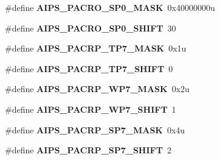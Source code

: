 \begin{DoxyCompactItemize}
\item 
\hypertarget{group___a_i_p_s___register___masks_gae111c6dd6b157819d492adaad93d3808}{}\#define {\bfseries A\+I\+P\+S\+\_\+\+P\+A\+C\+R\+O\+\_\+\+S\+P0\+\_\+\+M\+A\+S\+K}~0x40000000u\label{group___a_i_p_s___register___masks_gae111c6dd6b157819d492adaad93d3808}

\item 
\hypertarget{group___a_i_p_s___register___masks_ga79d6c2d1da36742105657a59faba869d}{}\#define {\bfseries A\+I\+P\+S\+\_\+\+P\+A\+C\+R\+O\+\_\+\+S\+P0\+\_\+\+S\+H\+I\+F\+T}~30\label{group___a_i_p_s___register___masks_ga79d6c2d1da36742105657a59faba869d}

\item 
\hypertarget{group___a_i_p_s___register___masks_ga4de7c83f4b93cd32b27b9b6a6ce21b9e}{}\#define {\bfseries A\+I\+P\+S\+\_\+\+P\+A\+C\+R\+P\+\_\+\+T\+P7\+\_\+\+M\+A\+S\+K}~0x1u\label{group___a_i_p_s___register___masks_ga4de7c83f4b93cd32b27b9b6a6ce21b9e}

\item 
\hypertarget{group___a_i_p_s___register___masks_ga1c553dab75f6ee70910eb46864ce7ac8}{}\#define {\bfseries A\+I\+P\+S\+\_\+\+P\+A\+C\+R\+P\+\_\+\+T\+P7\+\_\+\+S\+H\+I\+F\+T}~0\label{group___a_i_p_s___register___masks_ga1c553dab75f6ee70910eb46864ce7ac8}

\item 
\hypertarget{group___a_i_p_s___register___masks_ga59ca0ed1637115a15dfa3974b9872dd6}{}\#define {\bfseries A\+I\+P\+S\+\_\+\+P\+A\+C\+R\+P\+\_\+\+W\+P7\+\_\+\+M\+A\+S\+K}~0x2u\label{group___a_i_p_s___register___masks_ga59ca0ed1637115a15dfa3974b9872dd6}

\item 
\hypertarget{group___a_i_p_s___register___masks_gabbd49dc86ea00669bb8ba1744e579c03}{}\#define {\bfseries A\+I\+P\+S\+\_\+\+P\+A\+C\+R\+P\+\_\+\+W\+P7\+\_\+\+S\+H\+I\+F\+T}~1\label{group___a_i_p_s___register___masks_gabbd49dc86ea00669bb8ba1744e579c03}

\item 
\hypertarget{group___a_i_p_s___register___masks_ga81da12637e719c21a73493ac4a44bdea}{}\#define {\bfseries A\+I\+P\+S\+\_\+\+P\+A\+C\+R\+P\+\_\+\+S\+P7\+\_\+\+M\+A\+S\+K}~0x4u\label{group___a_i_p_s___register___masks_ga81da12637e719c21a73493ac4a44bdea}

\item 
\hypertarget{group___a_i_p_s___register___masks_ga2ffa5c9fa40b0c9b3267f0ef13acc087}{}\#define {\bfseries A\+I\+P\+S\+\_\+\+P\+A\+C\+R\+P\+\_\+\+S\+P7\+\_\+\+S\+H\+I\+F\+T}~2\label{group___a_i_p_s___register___masks_ga2ffa5c9fa40b0c9b3267f0ef13acc087}


\end{DoxyCompactItemize}
